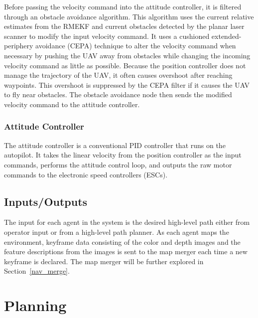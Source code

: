 \documentclass[letterpaper, 10 pt, conference]{ieeeconf}  %
\begin{document}
Before passing the velocity command into the attitude controller, it is filtered through an obstacle avoidance algorithm. This algorithm uses the current relative estimates from the RMEKF and current obstacles detected by the planar laser scanner to modify the input velocity command. It uses a cushioned extended-periphery avoidance (CEPA) technique \cite{Jackson2016} to alter the velocity command when necessary by pushing the UAV away from obstacles while changing the incoming velocity command as little as possible. Because the position controller does not manage the trajectory of the UAV, it often causes overshoot after reaching waypoints. This overshoot is suppressed by the CEPA filter if it causes the UAV to fly near obstacles. The obstacle avoidance node then sends the modified velocity command to the attitude controller.

\subsubsection{Attitude Controller}

The attitude controller is a conventional PID controller that runs on the autopilot. It takes the linear velocity from the position controller as the input commands, performs the attitude control loop, and outputs the raw motor commands to the electronic speed controllers (ESCs).

\subsection{Inputs/Outputs}

The input for each agent in the system is the desired high-level path either from operator input or from a high-level path planner. As each agent maps the environment, keyframe data consisting of the color and depth images and the  feature descriptions from the images is sent to the map merger each time a new keyframe is declared. The map merger will be further explored in Section~\ref{nav_merge}.

\section{Planning}\label{nav_planning}
\end{document}
